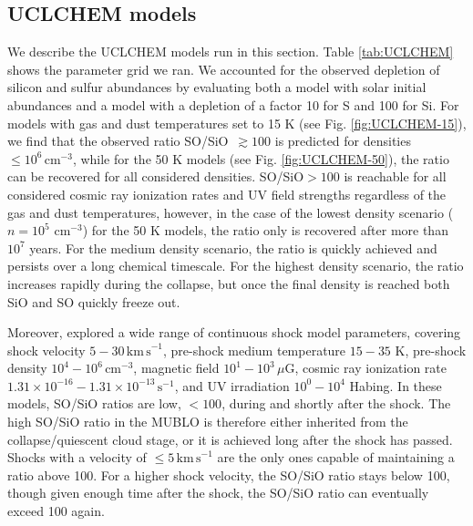 \documentclass[]{aastex631}
\newcommand{\percc}{\ensuremath{\mathrm{cm}^{-3}}\xspace}
\begin{document}
\clearpage
\subsection{UCLCHEM models}
\label{sec:uclchem}
We describe the UCLCHEM models run in this section.
Table \ref{tab:UCLCHEM} shows the parameter grid we ran.
We accounted for the observed depletion of silicon \citep[Si; e.g.,][]{Savage1996} and sulfur \citep[S; e.g.,][]{Palumbo1997} abundances by evaluating both a model with solar initial abundances and a model with a depletion of a factor 10 for S and 100 for Si.
For models with gas and dust temperatures set to 15 K (see Fig. \ref{fig:UCLCHEM-15}), we find that the observed ratio SO/SiO~$\gtrsim100$ is predicted for  densities $\leq10^6\,\mathrm{cm}^{-3}$, while for the 50 K models (see Fig. \ref{fig:UCLCHEM-50}), the ratio can be recovered for all considered densities.
SO/SiO$>100$ is reachable for all considered cosmic ray ionization rates and UV field strengths regardless of the gas and dust temperatures, however, in the case of the lowest density scenario ($n=10^5$ \percc) for the 50 K models, the ratio only is recovered after more than $10^7$ years.
For the medium density scenario, the ratio is quickly achieved and persists over a long chemical timescale. For the highest density scenario, the ratio increases rapidly during the collapse, but once the final density is reached both SiO and SO quickly freeze out.

Moreover, \cite{DutkowskaVermarien2024} explored a wide range of continuous shock model parameters, covering shock velocity $5-30\,\mathrm{km\,s}^{-1}$, pre-shock medium temperature $15-35$ K, pre-shock density $10^4-10^6\,\mathrm{cm}^{-3}$, magnetic field $10^{1}-10^{3}\,\mu\mathrm{G}$, cosmic ray ionization rate $1.31\times10^{-16}-1.31\times10^{-13}\,\mathrm{s}^{-1}$, and UV irradiation $10^0-10^4$ Habing. 
In these models, SO/SiO ratios are low, $<100$, during and shortly after the shock.
The high SO/SiO ratio in the MUBLO is therefore either inherited from the collapse/quiescent cloud stage, or it is achieved long after the shock has passed. 
Shocks with a velocity of $\leq 5\,\mathrm{km\,s}^{-1}$ are the only ones capable of maintaining a ratio above 100. 
For a higher shock velocity, the SO/SiO ratio stays below 100, though given enough time after the shock, the SO/SiO ratio can eventually exceed 100 again.
\end{document}

